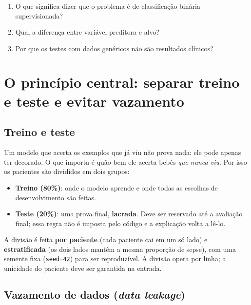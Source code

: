 \documentclass[11pt,a4paper]{article}
\newcommand{\cod}[1]{\texttt{#1}}
\begin{document}
\begin{teste}
\begin{enumerate}
  \item O que significa dizer que o problema é de classificação binária supervisionada?
  \item Qual a diferença entre variável preditora e alvo?
  \item Por que os testes com dados genéricos não são resultados clínicos?
\end{enumerate}
\end{teste}

\section{O princípio central: separar treino e teste e evitar vazamento}

\subsection{Treino e teste}

Um modelo que acerta os exemplos que já viu não prova nada: ele pode apenas ter decorado. O que importa é
quão bem ele acerta bebês \emph{que nunca viu}. Por isso os pacientes são divididos em dois grupos:

\begin{itemize}
  \item \textbf{Treino (80\%)}: onde o modelo aprende e onde todas as escolhas de desenvolvimento são feitas.
  \item \textbf{Teste (20\%)}: uma prova final, \textbf{lacrada}. Deve ser reservado até a avaliação final; essa regra não é imposta pelo código e a explicação volta a lê-lo.
\end{itemize}

A divisão é feita \textbf{por paciente} (cada paciente cai em um só lado) e \textbf{estratificada} (os dois lados mantêm a
mesma proporção de sepse), com uma semente fixa (\cod{seed=42}) para ser reproduzível. A divisão opera por linha; a unicidade do paciente deve ser garantida na entrada.

\subsection{Vazamento de dados (\emph{data leakage})}
\end{document}
